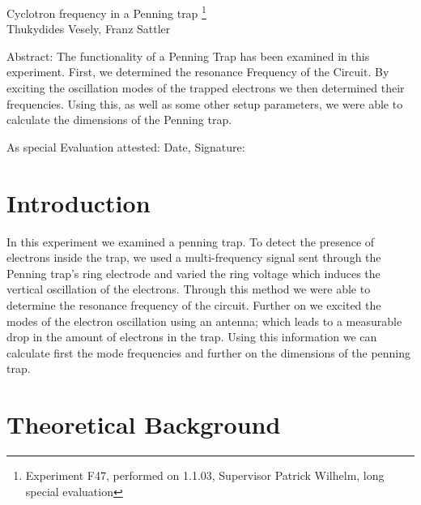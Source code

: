 \documentclass[12pt]{article}
\begin{document}
\thispagestyle{empty}     %
\null\vspace{40mm}
\begin{center}
{%
\Large  Cyclotron frequency in a Penning
trap
\footnote{\noindent Experiment F47, performed on 1.1.03,
Supervisor Patrick Wilhelm,
long special evaluation}
}\\[15mm]
Thukydides Vesely, Franz Sattler

\vspace{25mm}

\parbox{0.9\textwidth}{   %
Abstract:    
\small The functionality of a Penning Trap has been examined in this experiment. First, we determined the resonance Frequency of the Circuit. By exciting the oscillation modes of the trapped electrons we then determined their frequencies. Using this, as well as some other setup parameters, we were able to calculate the dimensions of the Penning trap.
}
\end{center}

\vfill
As special Evaluation attested: Date, Signature:
\vspace{20mm}

\newpage  
\null\thispagestyle{empty} 
   

\newpage

\section{Introduction}
In this experiment we examined a penning trap. To detect the presence of electrons inside the trap, we used a multi-frequency signal sent through the Penning trap's ring electrode and varied the ring voltage which induces the vertical oscillation of the electrons. Through this method we were able to determine the resonance frequency of the circuit.
Further on we excited the modes of the electron oscillation using an antenna; which leads to a measurable drop in the amount of electrons in the trap. Using this information we can calculate first the mode frequencies and further on the dimensions of the penning trap.

\section{Theoretical Background}
\end{document}
